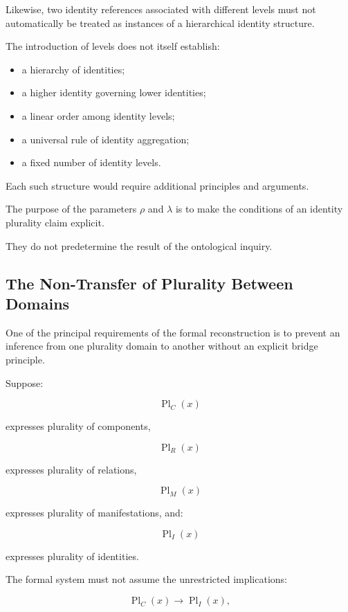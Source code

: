 Likewise, two identity references
associated with different levels
must not automatically be treated
as instances of a hierarchical
identity structure.

The introduction of levels does
not itself establish:

\begin{itemize}
    \item a hierarchy of identities;
    \item a higher identity governing
    lower identities;
    \item a linear order among identity
    levels;
    \item a universal rule of identity
    aggregation;
    \item a fixed number of identity
    levels.
\end{itemize}

Each such structure would require
additional principles and arguments.

The purpose of the parameters
\(\rho\) and \(\lambda\) is to
make the conditions of an identity
plurality claim explicit.

They do not predetermine the result
of the ontological inquiry.

\subsection{The Non-Transfer of Plurality Between Domains}

One of the principal requirements
of the formal reconstruction is
to prevent an inference from one
plurality domain to another without
an explicit bridge principle.

Suppose:

\[
    \operatorname{Pl}_{C}(x)
\]

expresses plurality of components,

\[
    \operatorname{Pl}_{R}(x)
\]

expresses plurality of relations,

\[
    \operatorname{Pl}_{M}(x)
\]

expresses plurality of manifestations,
and:

\[
    \operatorname{Pl}_{I}(x)
\]

expresses plurality of identities.

The formal system must not assume
the unrestricted implications:

\[
    \operatorname{Pl}_{C}(x)
    \rightarrow
    \operatorname{Pl}_{I}(x),
\]

